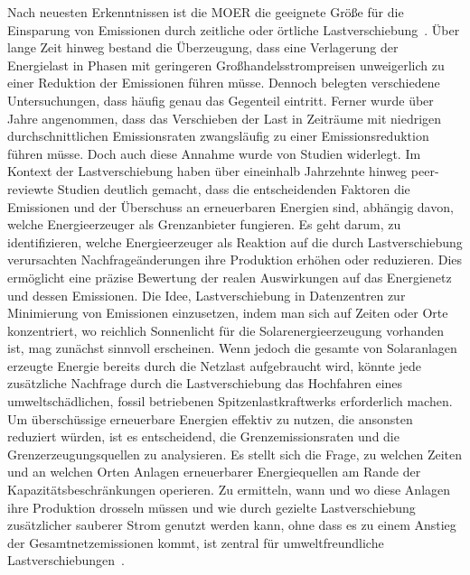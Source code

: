 Nach neuesten Erkenntnissen ist die \ac{MOER} die geeignete Größe für die Einsparung von Emissionen durch zeitliche oder örtliche Lastverschiebung~\cite{Schram.03.05.201905.05.2019}\cite{WattTime.12.3.2024}.
Über lange Zeit hinweg bestand die Überzeugung, dass eine Verlagerung der Energielast in Phasen mit geringeren Großhandelsstrompreisen unweigerlich zu einer Reduktion der Emissionen führen müsse.
Dennoch belegten verschiedene Untersuchungen, dass häufig genau das Gegenteil eintritt.
Ferner wurde über Jahre angenommen, dass das Verschieben der Last in Zeiträume mit niedrigen durchschnittlichen Emissionsraten zwangsläufig zu einer Emissionsreduktion führen müsse.
Doch auch diese Annahme wurde von Studien widerlegt.
Im Kontext der Lastverschiebung haben über eineinhalb Jahrzehnte hinweg peer-reviewte Studien deutlich gemacht, dass die entscheidenden Faktoren die Emissionen und der Überschuss an erneuerbaren Energien sind, abhängig davon, welche Energieerzeuger als Grenzanbieter fungieren.
Es geht darum, zu identifizieren, welche Energieerzeuger als Reaktion auf die durch Lastverschiebung verursachten Nachfrageänderungen ihre Produktion erhöhen oder reduzieren.
Dies ermöglicht eine präzise Bewertung der realen Auswirkungen auf das Energienetz und dessen Emissionen.
Die Idee, Lastverschiebung in Datenzentren zur Minimierung von Emissionen einzusetzen, indem man sich auf Zeiten oder Orte konzentriert, wo reichlich Sonnenlicht für die Solarenergieerzeugung vorhanden ist, mag zunächst sinnvoll erscheinen.
Wenn jedoch die gesamte von Solaranlagen erzeugte Energie bereits durch die Netzlast aufgebraucht wird, könnte jede zusätzliche Nachfrage durch die Lastverschiebung das Hochfahren eines umweltschädlichen, fossil betriebenen Spitzenlastkraftwerks erforderlich machen.
Um überschüssige erneuerbare Energien effektiv zu nutzen, die ansonsten reduziert würden, ist es entscheidend, die Grenzemissionsraten und die Grenzerzeugungsquellen zu analysieren.
Es stellt sich die Frage, zu welchen Zeiten und an welchen Orten Anlagen erneuerbarer Energiequellen am Rande der Kapazitätsbeschränkungen operieren.
Zu ermitteln, wann und wo diese Anlagen ihre Produktion drosseln müssen und wie durch gezielte Lastverschiebung zusätzlicher sauberer Strom genutzt werden kann, ohne dass es zu einem Anstieg der Gesamtnetzemissionen kommt, ist zentral für umweltfreundliche Lastverschiebungen~\cite{WattTime.12.3.2024}.

